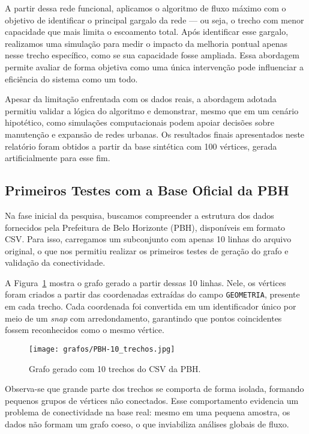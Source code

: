 \documentclass[12pt]{article}
\begin{document}
A partir dessa rede funcional, aplicamos o algoritmo de fluxo máximo com o objetivo de identificar o principal gargalo da rede — ou seja, o trecho com menor capacidade que mais limita o escoamento total. Após identificar esse gargalo, realizamos uma simulação para medir o impacto da melhoria pontual apenas nesse trecho específico, como se sua capacidade fosse ampliada. Essa abordagem permite avaliar de forma objetiva como uma única intervenção pode influenciar a eficiência do sistema como um todo.

Apesar da limitação enfrentada com os dados reais, a abordagem adotada permitiu validar a lógica do algoritmo e demonstrar, mesmo que em um cenário hipotético, como simulações computacionais podem apoiar decisões sobre manutenção e expansão de redes urbanas. Os resultados finais apresentados neste relatório foram obtidos a partir da base sintética com 100 vértices, gerada artificialmente para esse fim.

\subsection{Primeiros Testes com a Base Oficial da PBH}

Na fase inicial da pesquisa, buscamos compreender a estrutura dos dados fornecidos pela Prefeitura de Belo Horizonte (PBH), disponíveis em formato CSV. Para isso, carregamos um subconjunto com apenas 10 linhas do arquivo original, o que nos permitiu realizar os primeiros testes de geração do grafo e validação da conectividade.

A Figura~\ref{fig:grafo_pbh} mostra o grafo gerado a partir dessas 10 linhas. Nele, os vértices foram criados a partir das coordenadas extraídas do campo \texttt{GEOMETRIA}, presente em cada trecho. Cada coordenada foi convertida em um identificador único por meio de um \textit{snap} com arredondamento, garantindo que pontos coincidentes fossem reconhecidos como o mesmo vértice.

\begin{figure}[H]
\centering
\texttt{[image: grafos/PBH-10\_trechos.jpg]}
\caption{Grafo gerado com 10 trechos do CSV da PBH.}
\label{fig:grafo_pbh}
\end{figure}

Observa-se que grande parte dos trechos se comporta de forma isolada, formando pequenos grupos de vértices não conectados. Esse comportamento evidencia um problema de conectividade na base real: mesmo em uma pequena amostra, os dados não formam um grafo coeso, o que inviabiliza análises globais de fluxo.
\end{document}
